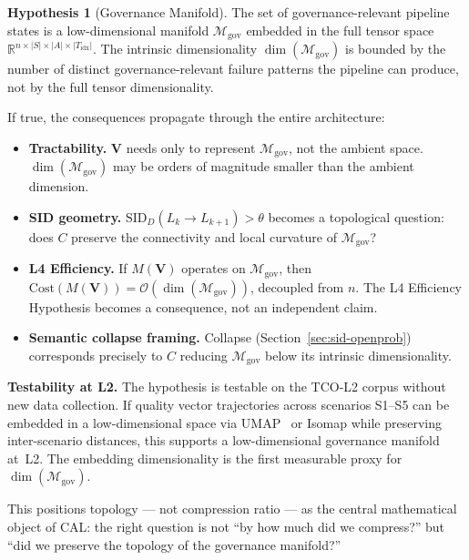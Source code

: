 \documentclass[11pt]{article}
\theoremstyle{definition}
\newtheorem{hypothesis}{Hypothesis}
\theoremstyle{remark}
\begin{document}
\begin{hypothesis}[Governance Manifold]
The set of governance-relevant pipeline states is a low-dimensional
manifold $\mathcal{M}_{\mathrm{gov}}$ embedded in the full tensor
space
$\mathbb{R}^{n \times |S| \times |A| \times |T_{\mathrm{idx}}|}$.
The intrinsic dimensionality $\dim(\mathcal{M}_{\mathrm{gov}})$ is
bounded by the number of distinct governance-relevant failure
patterns the pipeline can produce, not by the full tensor
dimensionality.
\end{hypothesis}

If true, the consequences propagate through the entire architecture:
\begin{itemize}[leftmargin=1.5em]
  \item \textbf{Tractability.} $\mathbf{V}$ needs only to represent
    $\mathcal{M}_{\mathrm{gov}}$, not the ambient space.
    $\dim(\mathcal{M}_{\mathrm{gov}})$ may be orders of magnitude
    smaller than the ambient dimension.

  \item \textbf{SID geometry.} $\text{SID}_D(L_k \to L_{k+1}) > \theta$
    becomes a topological question: does $C$ preserve the connectivity
    and local curvature of $\mathcal{M}_{\mathrm{gov}}$?

  \item \textbf{L4 Efficiency.} If $M(\mathbf{V})$ operates on
    $\mathcal{M}_{\mathrm{gov}}$, then
    $\text{Cost}(M(\mathbf{V})) = \mathcal{O}(\dim(\mathcal{M}_{\mathrm{gov}}))$,
    decoupled from $n$. The L4 Efficiency Hypothesis becomes a
    consequence, not an independent claim.

  \item \textbf{Semantic collapse framing.} Collapse
    (Section~\ref{sec:sid-openprob}) corresponds precisely to $C$
    reducing $\mathcal{M}_{\mathrm{gov}}$ below its intrinsic
    dimensionality.
\end{itemize}

\medskip
\noindent\textbf{Testability at L2.} The hypothesis is testable on
the TCO-L2 corpus without new data collection. If quality vector
trajectories across scenarios S1--S5 can be embedded in a
low-dimensional space via UMAP~\cite{mcinnes2018umap} or Isomap
while preserving inter-scenario distances, this supports a
low-dimensional governance manifold at~L2. The embedding
dimensionality is the first measurable proxy for
$\dim(\mathcal{M}_{\mathrm{gov}})$.

This positions topology --- not compression ratio --- as the central
mathematical object of CAL: the right question is not ``by how much
did we compress?'' but ``did we preserve the topology of the
governance manifold?''
\end{document}
